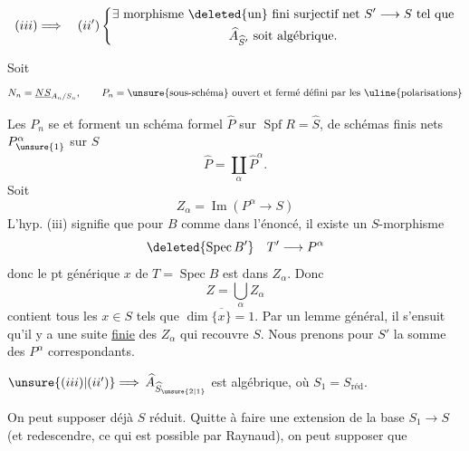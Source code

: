 
\[
(iii)\Longrightarrow\quad (ii')\left\{\begin{gathered}\exists\text{ morphisme }\deleted{\text{un}}\text{ fini surjectif net }S'\longrightarrow S\text{ tel que}\\ \widehat A_{\widehat S'}\text{ soit algébrique.}\end{gathered}\right.
\]

Soit 
\[
N_n=\underline{NS}_{A_n/S_n},\qquad P_n=\text{\unsure{sous-schéma} ouvert et fermé défini par les \uline{polarisations}}
\]

Les $P_n$ se  et forment un schéma formel $\widehat P$ sur $\operatorname{Spf}R=\widehat S$,   de schémas finis nets $P^\alpha_{\unsure{1}}$ sur $S$
\[
\widehat P=\coprod_\alpha\widehat P^\alpha.
\]
Soit
\[
Z_\alpha=\operatorname{Im}(P^\alpha\longrightarrow S)
\]
L'hyp. (iii) signifie que pour $B$ comme dans l'énoncé, il existe un  $S$-morphisme
\[
\deleted{\operatorname{Spec}B'}\quad T'\longrightarrow P^\alpha
\]
donc le pt générique $x$ de $T=\operatorname{Spec}B$ est dans $Z_\alpha$.
Donc
\[
Z=\bigcup_\alpha Z_\alpha
\]
contient tous les $x\in S$ tels que $\dim\overline{\{x\}}=1$.
Par un lemme général, il s'ensuit qu'il y a une suite \uline{finie} des $Z_\alpha$ qui recouvre $S$. Nous prenons pour $S'$ la somme des $P^\alpha$ correspondants.

$\unsure{(iii)|(ii')}\Longrightarrow$   $\widehat A_{\widehat S_{\unsure{2|1}}}$ est algébrique, où $S_1=S_{\text{réd}}$.

On peut supposer déjà $S$ réduit. Quitte à faire une extension de la base $S_1\longrightarrow S$ (et redescendre,  ce qui est possible par Raynaud), on peut supposer que

